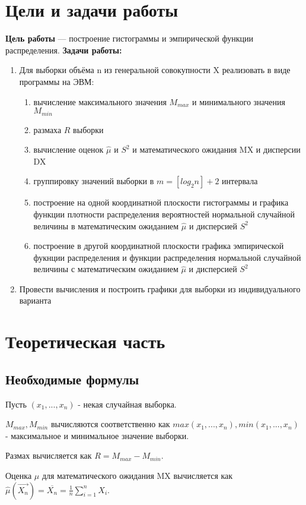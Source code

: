 \chapter{Цели и задачи работы}
\textbf{Цель работы} --- построение гистограммы и эмпирической функции распределения.
\textbf{Задачи работы:}
\begin{enumerate}
\item Для выборки объёма n из генеральной совокупности X реализовать в виде программы на ЭВМ:
\begin{enumerate}
\item вычисление максимального значения $M_{max}$ и минимального значения $M_{min}$
\item размаха $R$ выборки
\item вычисление оценок $\hat{\mu}$ и $S^{2}$ и математического ожидания MX и дисперсии DX
\item группировку значений выборки в $m = [log_{2} n] + 2$ интервала
\item построение на одной координатной плоскости гистограммы и графика функции плотности распределения вероятностей нормальной случайной величины в математическим ожиданием $\hat{\mu}$ и дисперсией $S^{2}$
\item построение в другой координатной плоскости графика эмпирической фукнции распределения и функции распределения нормальной случайной величины с математическим ожиданием $\hat{\mu}$ и дисперсией $S^{2}$
\end{enumerate}
\item Провести вычисления и построить графики для выборки из индивидуального варианта
\end{enumerate}

\chapter{Теоретическая часть}
\section{Необходимые формулы}
Пусть $(x_{1}, ..., x_{n})$ - некая случайная выборка. 

$M_{max}, M_{min}$ вычисляются соответственно как $max(x_{1}, ..., x_{n}), min(x_{1}, ..., x_{n})$ - максимальное и минимальное значение выборки.

Размах вычисляется как $R = M_{max} - M_{min}$.

Оценка $\hat{\mu}$ для математического ожидания MX вычисляется как $\hat{\mu}(\overrightarrow{X_{n}}) = \overline{X_{n}} = \frac{1}{n}\sum\limits_{i=1}^{n} X_{i}$.

